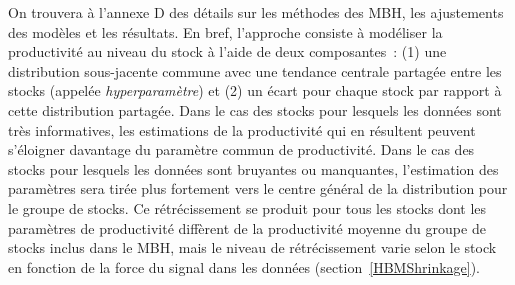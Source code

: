 \documentclass[french,11pt]{book}
\begin{document}
On trouvera à l'annexe D des détails sur les méthodes des MBH, les ajustements des modèles et les résultats. En bref, l'approche consiste à modéliser la productivité au niveau du stock à l'aide de deux composantes~: (1) une distribution sous-jacente commune avec une tendance centrale partagée entre les stocks (appelée \emph{hyperparamètre}) et (2) un écart pour chaque stock par rapport à cette distribution partagée. Dans le cas des stocks pour lesquels les données sont très informatives, les estimations de la productivité qui en résultent peuvent s'éloigner davantage du paramètre commun de productivité. Dans le cas des stocks pour lesquels les données sont bruyantes ou manquantes, l'estimation des paramètres sera tirée plus fortement vers le centre général de la distribution pour le groupe de stocks. Ce rétrécissement se produit pour tous les stocks dont les paramètres de productivité diffèrent de la productivité moyenne du groupe de stocks inclus dans le MBH, mais le niveau de rétrécissement varie selon le stock en fonction de la force du signal dans les données (section~\ref{HBMShrinkage}).
\end{document}

